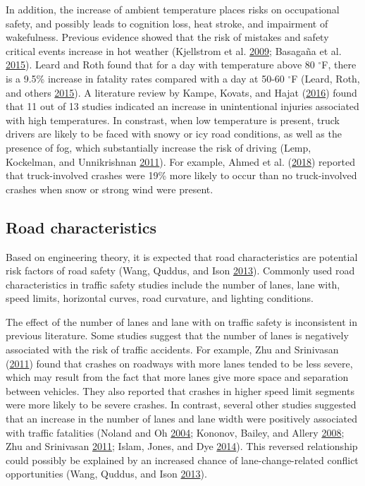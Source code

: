 \documentclass[12pt]{book}
\numberwithin{equation}{chapter}
\begin{document}
In addition, the increase of ambient temperature places risks on occupational safety, and possibly leads to cognition loss, heat stroke, and impairment of wakefulness. Previous evidence showed that the risk of mistakes and safety critical events increase in hot weather (Kjellstrom et al. \protect\hyperlink{ref-kjellstrom2009direct}{2009}; Basagaña et al. \protect\hyperlink{ref-basagana2015high}{2015}). Leard and Roth found that for a day with temperature above 80 \(^{\circ}\)F, there is a 9.5\% increase in fatality rates compared with a day at 50-60 \(^{\circ}\)F (Leard, Roth, and others \protect\hyperlink{ref-leard2015weather}{2015}). A literature review by Kampe, Kovats, and Hajat (\protect\hyperlink{ref-im2016impact}{2016}) found that 11 out of 13 studies indicated an increase in unintentional injuries associated with high temperatures. In constrast, when low temperature is present, truck drivers are likely to be faced with snowy or icy road conditions, as well as the presence of fog, which substantially increase the risk of driving (Lemp, Kockelman, and Unnikrishnan \protect\hyperlink{ref-lemp2011analysis}{2011}). For example, Ahmed et al. (\protect\hyperlink{ref-ahmed2018effects}{2018}) reported that truck-involved crashes were 19\% more likely to occur than no truck-involved crashes when snow or strong wind were present.

\hypertarget{road-characteristics}{%
\subsection{Road characteristics}\label{road-characteristics}}

Based on engineering theory, it is expected that road characteristics are potential risk factors of road safety (Wang, Quddus, and Ison \protect\hyperlink{ref-wang2013effect}{2013}). Commonly used road characteristics in traffic safety studies include the number of lanes, lane with, speed limits, horizontal curves, road curvature, and lighting conditions.

The effect of the number of lanes and lane with on traffic safety is inconsistent in previous literature. Some studies suggest that the number of lanes is negatively associated with the risk of traffic accidents. For example, Zhu and Srinivasan (\protect\hyperlink{ref-zhu2011comprehensive}{2011}) found that crashes on roadways with more lanes tended to be less severe, which may result from the fact that more lanes give more space and separation between vehicles. They also reported that crashes in higher speed limit segments were more likely to be severe crashes. In contrast, several other studies suggested that an increase in the number of lanes and lane width were positively associated with traffic fatalities (Noland and Oh \protect\hyperlink{ref-noland2004effect}{2004}; Kononov, Bailey, and Allery \protect\hyperlink{ref-kononov2008relationships}{2008}; Zhu and Srinivasan \protect\hyperlink{ref-zhu2011comprehensive}{2011}; Islam, Jones, and Dye \protect\hyperlink{ref-islam2014comprehensive}{2014}). This reversed relationship could possibly be explained by an increased chance of lane-change-related conflict opportunities (Wang, Quddus, and Ison \protect\hyperlink{ref-wang2013effect}{2013}).
\end{document}
